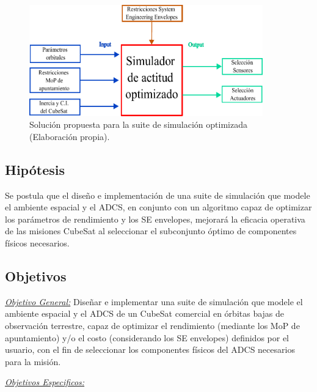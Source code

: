 \begin{figure}[h]
	\centering    
	\includegraphics[width=0.9\textwidth]{bloque02.pdf}
	\caption{Solución propuesta para la suite de simulación optimizada (Elaboración propia).}
	\label{fig:bloques02}
\end{figure}

\subsection{Hipótesis}
Se postula que el diseño e implementación de una suite de simulación que modele el ambiente espacial y el \gls{ADCS}, en conjunto con un algoritmo capaz de optimizar los parámetros de rendimiento y los SE envelopes, mejorará la eficacia operativa de las misiones CubeSat al seleccionar el subconjunto óptimo de componentes físicos necesarios.

\subsection{Objetivos}
\textit{\underline{Objetivo General:}} Diseñar e implementar una suite de simulación que modele el ambiente espacial y el \gls{ADCS} de un CubeSat comercial en órbitas bajas de observación terrestre, capaz de optimizar el rendimiento (mediante los MoP de apuntamiento) y/o el costo (considerando los SE envelopes) definidos por el usuario, con el fin de seleccionar los componentes físicos del \gls{ADCS} necesarios para la misión.

\textit{\underline{Objetivos Especificos:}}

